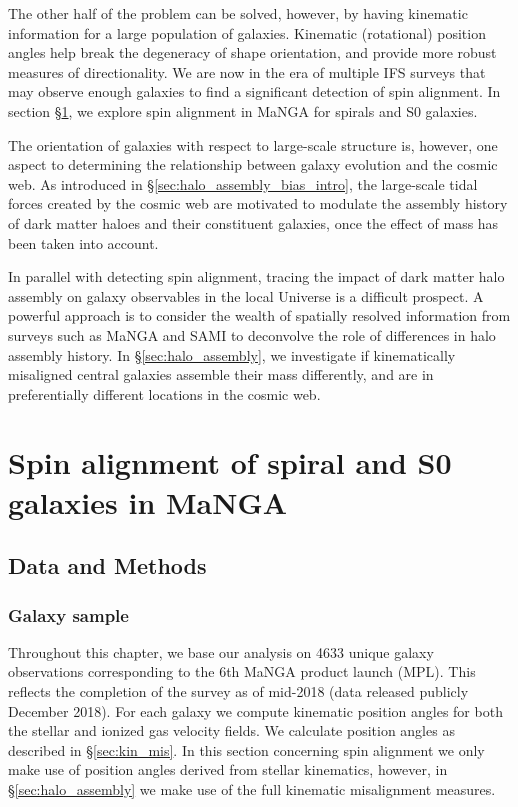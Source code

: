 The other half of the problem can be solved, however, by having kinematic information for a large population of galaxies. Kinematic (rotational) position angles help break the degeneracy of shape orientation, and provide more robust measures of directionality. We are now in the era of multiple IFS surveys that may observe enough galaxies to find a significant detection of spin alignment. In section \S\ref{sec:spin_alignment}, we explore spin alignment in MaNGA for spirals and S0 galaxies.

The orientation of galaxies with respect to large-scale structure is, however, one aspect to determining the relationship between galaxy evolution and the cosmic web. As introduced in \S\ref{sec:halo_assembly_bias_intro}, the large-scale tidal forces created by the cosmic web are motivated to modulate the assembly history of dark matter haloes and their constituent galaxies, once the effect of mass has been taken into account. 

In parallel with detecting spin alignment, tracing the impact of dark matter halo assembly on galaxy observables in the local Universe is a difficult prospect. A powerful approach is to consider the wealth of spatially resolved information from surveys such as MaNGA and SAMI to deconvolve the role of differences in halo assembly history. In \S\ref{sec:halo_assembly}, we investigate if kinematically misaligned central galaxies assemble their mass differently, and are in preferentially different locations in the cosmic web.

\section{Spin alignment of spiral and S0 galaxies in MaNGA} \label{sec:spin_alignment}

\subsection{Data and Methods}

\subsubsection{Galaxy sample}
Throughout this chapter, we base our analysis on 4633 unique galaxy observations corresponding to the 6th MaNGA product launch (MPL). This reflects the completion of the survey as of mid-2018 (data released publicly December 2018). For each galaxy we compute kinematic position angles for both the stellar and ionized gas velocity fields. We calculate position angles as described in \S\ref{sec:kin_mis}. In this section concerning spin alignment we only make use of position angles derived from stellar kinematics, however, in \S\ref{sec:halo_assembly} we make use of the full kinematic misalignment measures. 

